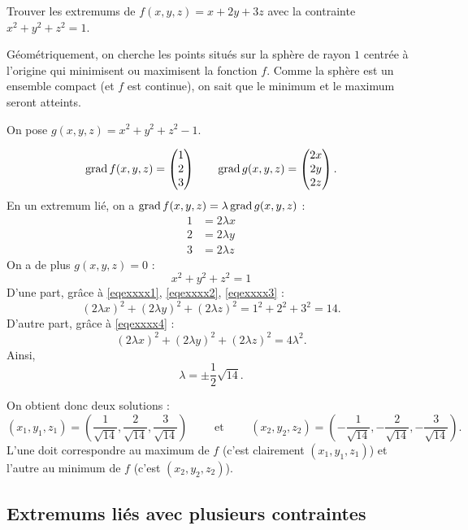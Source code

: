 \documentclass[11pt, class=report,crop=false]{standalone}
\begin{document}
\begin{exemple}
Trouver les extremums de $f(x,y,z) = x + 2y +3z$ avec la contrainte $x^2 + y^2 + z^2 = 1$.

Géométriquement, on cherche les points situés sur la sphère de rayon $1$ centrée à l'origine qui minimisent ou maximisent la fonction $f$. Comme la sphère est un ensemble compact (et $f$ est continue), on sait que le minimum et le maximum seront atteints.


On pose $g(x,y,z) = x^2 + y^2 + z^2 - 1$.

$$\operatorname{grad} f(x,y,z) = \begin{pmatrix} 1 \\ 2 \\ 3 \end{pmatrix}
\qquad \operatorname{grad} g(x,y,z) = \begin{pmatrix} 2x \\ 2y \\ 2z \end{pmatrix}.$$
En un extremum lié, on a $\operatorname{grad} f(x,y,z) = \lambda \operatorname{grad} g(x,y,z)$ :
\setcounter{equation}{0}
\begin{align}
1 &= 2\lambda x \label{eqexxxx1}\\
2 &= 2\lambda y \label{eqexxxx2}\\
3 &= 2\lambda z\label{eqexxxx3}
\end{align}
On a de plus $g(x,y,z) = 0$ :
\begin{equation}
x^2 + y^2 + z^2 = 1
\label{eqexxxx4}
\end{equation}
D'une part, grâce à \eqref{eqexxxx1}, \eqref{eqexxxx2}, \eqref{eqexxxx3} :
$$(2\lambda x)^2 + (2\lambda y)^2 + (2\lambda z)^2 = 1^2+2^2+3^2 = 14.$$
D'autre part, grâce à \eqref{eqexxxx4} :
$$(2\lambda x)^2 + (2\lambda y)^2 + (2\lambda z)^2 = 4\lambda^2.$$
Ainsi, 
$$\lambda  = \pm\frac12\sqrt{14}.$$

On obtient donc deux solutions :
$$(x_1,y_1,z_1) = \left( \frac{1}{\sqrt{14}}, \frac{2}{\sqrt{14}}, \frac{3}{\sqrt{14}}\right)
\qquad \text{ et } \qquad
(x_2,y_2,z_2) = \left( -\frac{1}{\sqrt{14}}, -\frac{2}{\sqrt{14}}, -\frac{3}{\sqrt{14}}\right).$$
L'une doit correspondre au maximum de $f$ (c'est clairement $(x_1,y_1,z_1)$) et l'autre au minimum de $f$ (c'est $(x_2,y_2,z_2)$).
\end{exemple}



\subsection{Extremums liés avec plusieurs contraintes}
\end{document}
